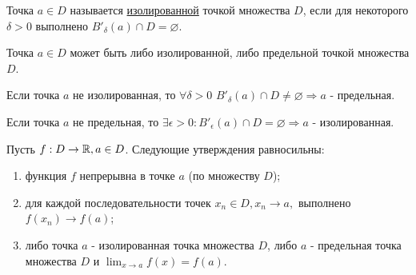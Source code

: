 	\begin{definition}
		Точка $a \in D$ называется \underline{изолированной} точкой множества $D$, если для некоторого $\delta > 0$ выполнено $B'_{\delta}(a) \cap D = \varnothing.$
	\end{definition}
	
	\begin{mention}
		Точка $a \in D$ может быть либо изолированной, либо предельной точкой множества $D$.
		
		Если точка $a$ не изолированная, то $\forall \delta > 0$ $B'_{\delta}(a) \cap D \neq \varnothing \Rightarrow a$ - предельная.
		
		Если точка $a$ не предельная, то $\exists \epsilon > 0: B'_{\epsilon}(a) \cap D = \varnothing \Rightarrow a$ - изолированная.
	\end{mention}
	
	\begin{sentence}
		Пусть $f : D \rightarrow \mathbb R, a \in D$. Следующие утверждения
		равносильны:
		\begin{enumerate}
			\item функция $f$ непрерывна в точке $a$ (по множеству $D$);
			\item для каждой последовательности точек $x_n \in D, x_n \to a,$ выполнено $f(x_n) \to f(a)$;
			\item либо точка $a$ - изолированная точка множества $D$, либо $a$ - предельная точка множества $D$ и $\lim_{x \to a} f(x) = f(a)$.
		\end{enumerate}
	\end{sentence}
	
